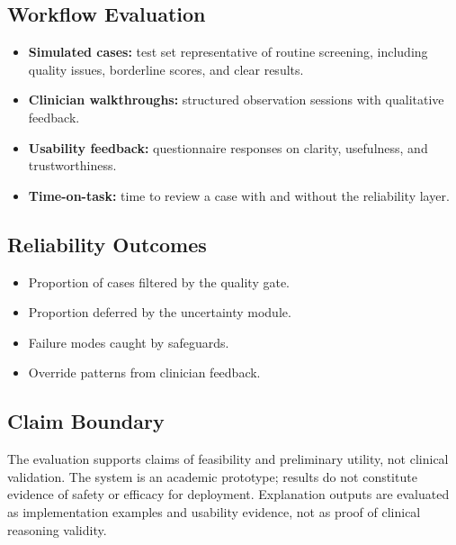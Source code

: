 \documentclass[conference, letterpaper]{IEEEtran}
\begin{document}
\subsection{Workflow Evaluation}

\begin{itemize}
    \item \textbf{Simulated cases:} test set representative of routine screening, including quality issues, borderline scores, and clear results.
    \item \textbf{Clinician walkthroughs:} structured observation sessions with qualitative feedback.
    \item \textbf{Usability feedback:} questionnaire responses on clarity, usefulness, and trustworthiness.
    \item \textbf{Time-on-task:} time to review a case with and without the reliability layer.
\end{itemize}

\subsection{Reliability Outcomes}

\begin{itemize}
    \item Proportion of cases filtered by the quality gate.
    \item Proportion deferred by the uncertainty module.
    \item Failure modes caught by safeguards.
    \item Override patterns from clinician feedback.
\end{itemize}

\subsection{Claim Boundary}

The evaluation supports claims of feasibility and preliminary utility, not clinical validation. The system is an academic prototype; results do not constitute evidence of safety or efficacy for deployment. Explanation outputs are evaluated as implementation examples and usability evidence, not as proof of clinical reasoning validity.

\end{document}
